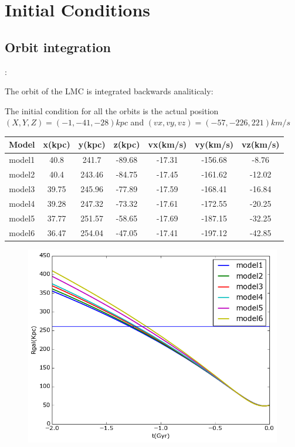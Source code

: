 \section{Initial Conditions}\label{sec:IC}

\subsection{Orbit integration}:

The orbit of the LMC is integrated backwards analiticaly:

The initial condition for all the orbits is the actual position 
$(X, Y, Z) = (-1, -41, -28)kpc$ and $(vx, vy, vz) = (-57, -226, 221)km/s$

\begin{table}[H]
\begin{center}
\begin{tabular}{c c c c c c c}
\hline
Model & x(kpc) & y(kpc) & z(kpc) &vx(km/s) & vy(km/s) & vz(km/s)\\
\hline
model1 & 40.8 & 241.7 & -89.68  & -17.31 & -156.68 & -8.76 \\
model2 & 40.4 & 243.46 & -84.75 & -17.45 & -161.62 & -12.02 \\
model3 & 39.75 & 245.96 & -77.89 & -17.59 & -168.41 & -16.84 \\     
model4 & 39.28 & 247.32 & -73.32 & -17.61 & -172.55 & -20.25 \\
model5 & 37.77 & 251.57 & -58.65 & -17.69 & -187.15 & -32.25 \\ 
model6 & 36.47 & 254.04 & -47.05 & -17.41 & -197.12 & -42.85 \\
\hline
\end{tabular}
\end{center}
\end{table}


\begin{figure}[H]
\centering
\includegraphics[scale=0.7]{../code/LMC_orbit/LMC_orbits.png}
\end{figure}
